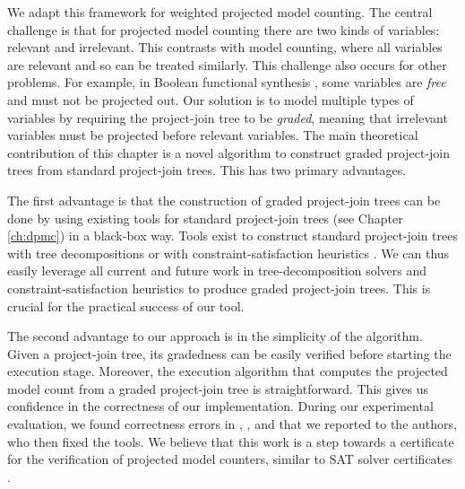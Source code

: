 We adapt this framework for weighted projected model counting. The central challenge is that for projected model counting there are two kinds of variables: relevant and irrelevant. This contrasts with model counting, where all variables are relevant and so can be treated similarly. This challenge also occurs for other problems.
For example, in Boolean functional synthesis \cite{tabajara2017factored}, some variables are \emph{free} and must not be projected out. 
Our solution is to model multiple types of variables by requiring the project-join tree to be \emph{graded}, meaning that irrelevant variables must be projected before relevant variables. The main theoretical contribution of this chapter is a novel algorithm to construct graded project-join trees from standard project-join trees. This has two primary advantages. 

The first advantage is that the construction of graded project-join trees can be done by using existing tools for standard project-join trees (see Chapter \ref{ch:dpmc}) in a black-box way. Tools exist to construct standard project-join trees with tree decompositions \cite{RS91} or with constraint-satisfaction heuristics \cite{tarjan1984simple,koster2001treewidth,dechter03,dechter99,bouquet1999gestion}.
We can thus easily leverage all current and future work in tree-decomposition solvers \cite{strasser2017computing,AMW17,Tamaki17} and constraint-satisfaction heuristics to produce graded project-join trees. This is crucial for the practical success of our tool.

The second advantage to our approach is in the simplicity of the algorithm. Given a project-join tree, its gradedness can be easily verified before starting the execution stage. 
Moreover, the execution algorithm that computes the projected model count from a graded project-join tree is straightforward. This gives us confidence in the correctness of our implementation.
During our experimental evaluation, we found correctness errors in \dfp{} \cite{lagniez2019recursive}, \projmc{} \cite{lagniez2019recursive}, and \ssat{} \cite{lee2017solving} that we reported to the authors, who then fixed the tools. 
We believe that this work is a step towards a certificate for the verification of projected model counters, similar to SAT solver certificates \cite{wetzler2014drat}.

